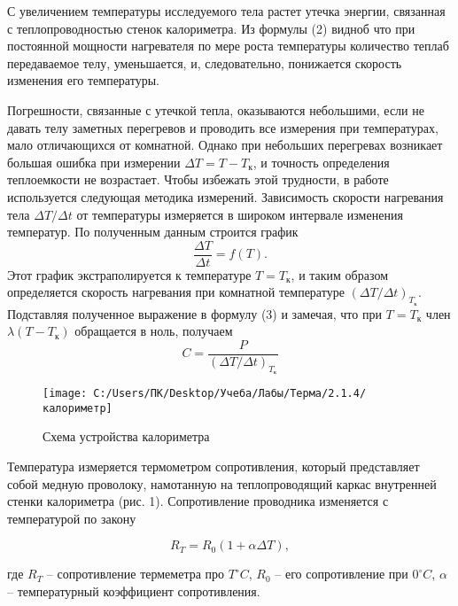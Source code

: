 \documentclass[12pt,a4paper]{article}
\begin{document}
С увеличением температуры исследуемого тела растет утечка энергии, связанная с теплопроводностью стенок калориметра. Из формулы (2) видноб что при постоянной мощности нагревателя по мере роста температуры количество теплаб передаваемое телу, уменьшается, и, следовательно, понижается скорость изменения его температуры.

Погрешности, связанные с утечкой тепла, оказываются небольшими, если не давать телу заметных перегревов и проводить все измерения при температурах, мало отличающихся от комнатной. Однако при небольших перегревах возникает большая ошибка при измерении $\Delta T = T - T_\text{к}$, и точность определения теплоемкости не возрастает. Чтобы избежать этой трудности, в работе используется следующая методика измерений. Зависимость скорости нагревания тела $\Delta T / \Delta t$ от температуры измеряется в широком интервале изменения температур. По полученным данным строится график
\begin{equation*}
    \frac{\Delta T}{\Delta t} = f(T).
\end{equation*}
Этот график экстраполируется к температуре $T = T_{\text{к}}$, и таким образом определяется скорость нагревания при комнатной температуре $(\Delta T / \Delta t)_{T_{\text{к}}}$. Подставляя полученное выражение в формулу (3) и замечая, что при $T = T_{\text{к}}$ член $\lambda(T - T_{\text{к}})$ обращается в ноль, получаем
\begin{equation}
    C = \frac{P}{(\Delta T / \Delta t)_{T_{\text{к}}}}
    \label{4}
\end{equation}


\begin{figure}[h]
	\centering
	\texttt{[image: C:/Users/ПК/Desktop/Учеба/Лабы/Терма/2.1.4/калориметр]}
	\caption{Схема устройства калориметра}
	\label{fig:calorimeter}
\end{figure}

Температура измеряется термометром сопротивления, который представляет собой медную проволоку, намотанную на теплопроводящий каркас внутренней стенки калориметра (рис. 1). Сопротивление проводника изменяется с температурой по закону

\begin{equation}
    R_{T} = R_{0}(1 + \alpha \Delta T),
    \label{RT}
\end{equation}

где $R_{T}$ -- сопротивление термеметра про $T  ^{\circ}C$, $R_{0}$ -- его сопротивление при $0  ^{\circ}C$, $\alpha$ -- температурный коэффициент сопротивления. 
\end{document}
